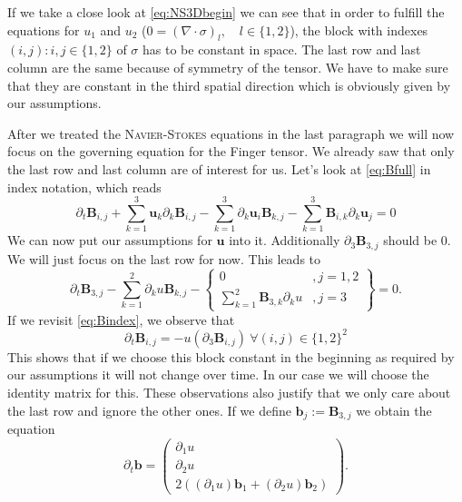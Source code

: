 \documentclass[12pt,a4paper]{scrartcl}
\numberwithin{equation}{section} %
\theoremstyle{definition}
\theoremstyle{plain}
\newcommand{\bfu}{\bm{u}}
\newcommand{\bfB}{\bm{B}}
\newcommand{\bfb}{\bm{b}}
\begin{document}
If we take a close look at \eqref{eq:NS3Dbegin} we can see that in order to fulfill the equations for $u_1$ and $u_2$ ($0=(\nabla\cdot\sigma)_l,\quad l\in\{1,2\}$), the block with indexes $(i,j):i,j\in\{1,2\}$ of $\sigma$ has to be constant in space. The last row and last column are the same because of symmetry of the tensor. We have to make sure that they are constant in the third spatial direction which is obviously given by our assumptions. 
\par After we treated the \textsc{Navier-Stokes} equations in the last paragraph we will now focus on the governing equation for the Finger tensor. We already saw that only the last row and last column are of interest for us. Let's look at \eqref{eq:Bfull} in index notation, which reads
\begin{equation}
\label{eq:Bindex}
    \partial_t \bm{B}_{i,j}+\sum_{k=1}^3\bm{u}_k\partial_k \bm{B}_{i,j}-\sum_{k=1}^3\partial_k\bm{u}_i\bm{B}_{k,j}-\sum_{k=1}^3\bm{B}_{i,k}\partial_k\bm{u}_j=0
\end{equation}
We can now put our assumptions for $\bfu$ into it. Additionally $\partial_3\bfB_{3,j}$ should be $0$. We will just focus on the last row for now. This leads to
\begin{equation}
    \partial_t \bm{B}_{3,j} -\sum_{k=1}^2\partial_ku\bm{B}_{k,j}-\left.\begin{cases}
    0 &, j=1,2\\ \sum_{k=1}^2 \bm{B}_{3,k}\partial_ku &, j=3
    \end{cases}\right\} =0.
\end{equation}
If we revisit \eqref{eq:Bindex}, we observe that
\begin{equation}
     \partial_t \bm{B}_{i,j}=-u(\partial_3 \bm{B}_{i,j})~\forall(i,j)\in\{1,2\}^2
\end{equation}
This shows that if we choose this block constant in the beginning as required by our assumptions it will not change over time. In our case we will choose the identity matrix for this. These observations also justify that we only care about the last row and ignore the other ones. If we define $\bfb_j:=\bfB_{3,j}$ we obtain the equation
\begin{equation}
   \partial_t \bm{b}=\begin{pmatrix}
   \partial_1u\\ \partial_2 u \\ 2\left((\partial_1 u)\bm{b}_1+(\partial_2 u)\bm{b}_2\right)
   \end{pmatrix}.
\end{equation}
\end{document}
